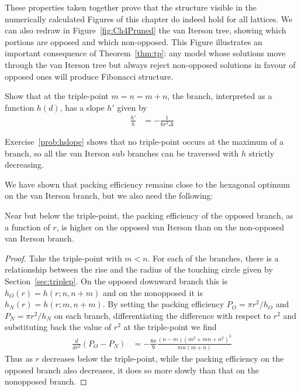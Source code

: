 These properties taken together prove that the structure visible in the numerically calculated Figures of this chapter do indeed hold for all lattices. We can also redraw in Figure~\ref{fig:Ch4Pruned} the van Iterson tree, showing which portions are opposed and which non-opposed. This Figure illustrates an important consequence of Theorem~\ref{thm:tp}: any model whose solutions move through the van Iterson tree but always reject non-opposed solutions in favour of opposed ones will produce Fibonacci structure. 



\begin{jExercise}
	Show that at the triple-point  $m=n=m+n$, the  branch, interpreted as a function $h(d)$, has a slope $h'$ given by 
	\begin{align}
		\frac{h'}{h} &= - \frac{1}{6 r^2 \Delta}
	\end{align}
	\label{prob:hslope}
\end{jExercise}
Exercise~\ref{prob:hslope} shows that no triple-point occurs at the maximum of a branch, so all the van Iterson sub branches can be traversed with $h$ strictly decreasing. 

We have shown that packing efficiency remains close to the hexagonal optimum on the van Iterson branch, but we also need the following:
\begin{theorem}
	Near but below the triple-point, the packing efficiency of the opposed branch, as a function of $r$, is higher on the opposed van Iterson than on the non-opposed van Iterson branch.
\end{theorem}
\begin{proof}
	Take the triple-point  with $m<n$. For each of the branches, there is a relationship between the rise and the radius of the touching circle given by Section~\ref{sec:triplep}. On the 
	opposed downward branch  this is $h_O(r)= h(r;n,n+m)$ and on the nonopposed   it is $h_N(r)=h(r;m,n+m)$. By setting the 
	packing efficiency  $P_O=\pi r^2/h_O$ and $P_N=\pi r^2/h_N$ on each branch, differentiating the difference with respect to $r^2$ and substituting back the value of $r^2$ at the triple-point we find
	\begin{align}
		\frac{d}{dr^2}(P_O-P_N) &= - \frac{8\pi}{9}\frac{(n- m )  (m^2+m n+n^2)^3}{mn(m+n)}
	\end{align}
	Thus as $r$ decreases below the triple-point, while the packing efficiency on the opposed branch also decreases, it does so more slowly than that on the nonopposed branch.  
\end{proof}




